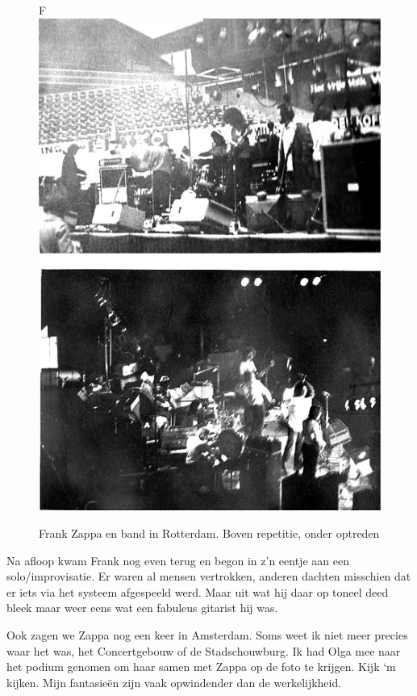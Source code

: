 \documentclass[12pt,twoside, openright]{memoir}
\begin{document}
\begin{figure}F
\centering
\includegraphics[width=\textwidth]{img/ch31/zappa}
\caption*{\footnotesize Frank Zappa en band in Rotterdam. Boven repetitie, onder optreden}
\end{figure} 

Na afloop kwam Frank nog even terug en begon in z’n eentje aan een solo/improvisatie. Er waren al mensen vertrokken, anderen dachten misschien dat er iets via het systeem afgespeeld werd. Maar uit wat hij daar op toneel deed bleek maar weer eens wat een fabuleus gitarist hij was.

Ook zagen we Zappa nog een keer in Amsterdam. Soms weet ik niet meer precies waar het was, het Concertgebouw of de Stadschouwburg. Ik had Olga mee naar het podium genomen om haar samen met Zappa op de foto te krijgen. Kijk ‘m kijken. Mijn fantasieën zijn vaak opwindender dan de werkelijkheid.
\end{document}

